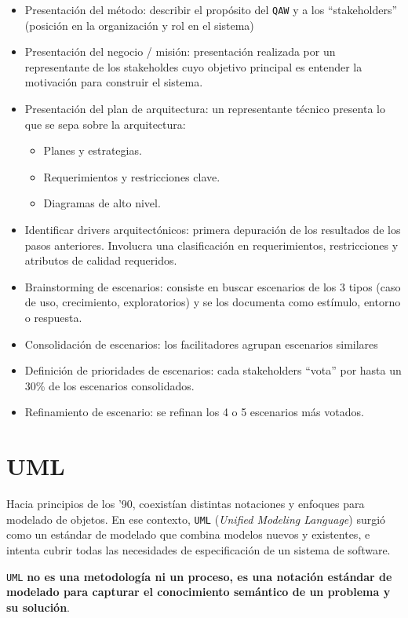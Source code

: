 \documentclass[]{article}
\begin{document}
\begin{itemize}
	\item Presentación del método: describir el propósito del \texttt{QAW} y a los ``stakeholders'' (posición en la organización y rol en el sistema)
	\item Presentación del negocio / misión: presentación realizada por un representante de los stakeholdes cuyo objetivo principal es entender la motivación para construir el sistema.
	\item Presentación del plan de arquitectura: un representante técnico presenta lo que se sepa sobre la arquitectura:
	\begin{itemize}
		\item Planes y estrategias.
		\item Requerimientos y restricciones clave.
		\item Diagramas de alto nivel.
	\end{itemize}
	\item Identificar drivers arquitectónicos: primera depuración de los resultados de los pasos anteriores. Involucra una clasificación en requerimientos, restricciones y atributos de calidad requeridos.
	\item Brainstorming de escenarios: consiste en buscar escenarios de los 3 tipos (caso de uso, crecimiento, exploratorios) y se los documenta como estímulo, entorno o respuesta.
	\item Consolidación de escenarios: los facilitadores agrupan escenarios similares
	\item Definición de prioridades de escenarios: cada stakeholders ``vota'' por hasta un 30\% de los escenarios consolidados.
	\item Refinamiento de escenario: se refinan los 4 o 5 escenarios más votados.
\end{itemize}


\section{UML}
Hacia principios de los '90, coexistían distintas notaciones y enfoques para modelado de objetos. En ese contexto, \texttt{UML} (\emph{Unified Modeling Language}) surgió como un estándar de modelado que combina modelos nuevos y existentes, e intenta cubrir todas las necesidades de especificación de un sistema de software.

\texttt{UML} \textbf{no es una metodología ni un proceso, es una notación estándar de modelado para capturar el conocimiento semántico de un problema y su solución}.
\end{document}
